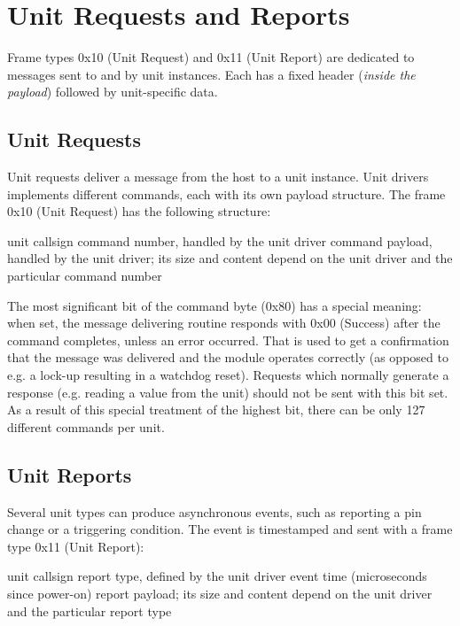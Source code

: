 \section{Unit Requests and Reports} \label{sec:unit_requests_reports}

Frame types 0x10 (Unit Request) and 0x11 (Unit Report) are dedicated to messages sent to and by unit instances. Each has a fixed header (\textit{inside the payload}) followed by unit-specific data.

\subsection{Unit Requests}

Unit requests deliver a message from the host to a unit instance. Unit drivers implements different commands, each with its own payload structure. The frame 0x10 (Unit Request) has the following structure:

\begin{boxedpayload}
	 unit callsign
	 command number, handled by the unit driver
	 command payload, handled by the unit driver; its size and content depend on the unit driver and the particular command number
\end{boxedpayload}

The most significant bit of the command byte (0x80) has a special meaning: when set, the message delivering routine responds with 0x00 (Success) after the command completes, unless an error occurred. That is used to get a confirmation that the message was delivered and the module operates correctly (as opposed to e.g. a lock-up resulting in a watchdog reset). Requests which normally generate a response (e.g. reading a value from the unit) should not be sent with this bit set. As a result of this special treatment of the highest bit, there can be only 127 different commands per unit.

\subsection{Unit Reports}

Several unit types can produce asynchronous events, such as reporting a pin change or a triggering condition. The event is timestamped and sent with a frame type 0x11 (Unit Report):

\begin{boxedpayload}
	 unit callsign
	 report type, defined by the unit driver
	 event time (microseconds since power-on)
	 report payload; its size and content depend on the unit driver and the particular report type
\end{boxedpayload}

















